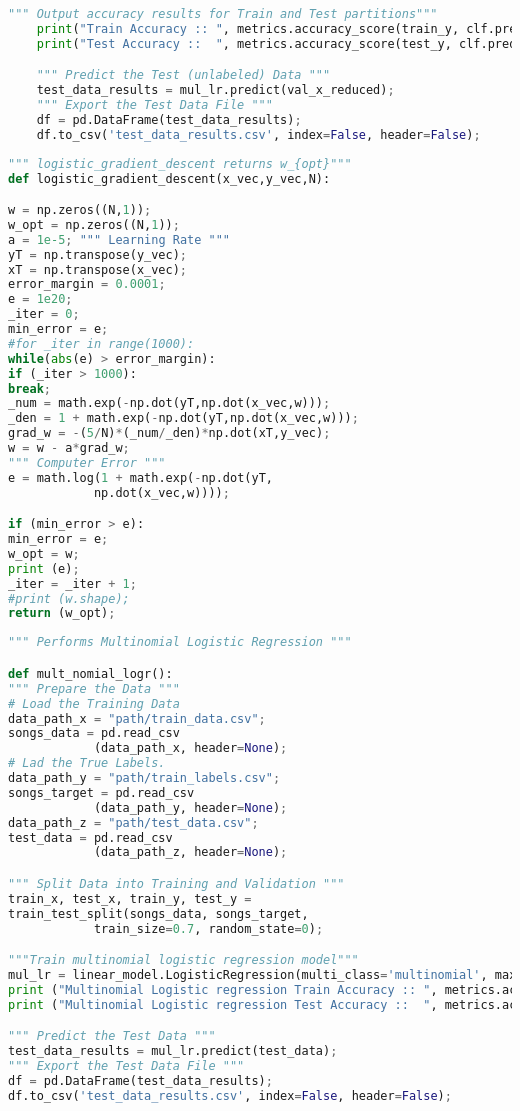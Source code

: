 \documentclass[journal]{IEEEtran}
\begin{document}
\begin{lstlisting}[language=Python, caption= KNN Clustering with Low Dimensional Embedding]
    """ Output accuracy results for Train and Test partitions"""
    print("Train Accuracy :: ", metrics.accuracy_score(train_y, clf.predict(train_x_reduced)));
    print("Test Accuracy ::  ", metrics.accuracy_score(test_y, clf.predict(test_x_reduced)));

	""" Predict the Test (unlabeled) Data """
	test_data_results = mul_lr.predict(val_x_reduced);
	""" Export the Test Data File """
	df = pd.DataFrame(test_data_results);
	df.to_csv('test_data_results.csv', index=False, header=False);
\end{lstlisting}

\begin{lstlisting}[language=Python, caption= Logistic Gradient Descent]
""" logistic_gradient_descent returns w_{opt}"""
def logistic_gradient_descent(x_vec,y_vec,N):

w = np.zeros((N,1));
w_opt = np.zeros((N,1));
a = 1e-5; """ Learning Rate """
yT = np.transpose(y_vec);
xT = np.transpose(x_vec);
error_margin = 0.0001;
e = 1e20;
_iter = 0;
min_error = e;
#for _iter in range(1000):
while(abs(e) > error_margin):
if (_iter > 1000):
break;
_num = math.exp(-np.dot(yT,np.dot(x_vec,w)));
_den = 1 + math.exp(-np.dot(yT,np.dot(x_vec,w)));
grad_w = -(5/N)*(_num/_den)*np.dot(xT,y_vec);
w = w - a*grad_w;
""" Computer Error """
e = math.log(1 + math.exp(-np.dot(yT,
			np.dot(x_vec,w))));

if (min_error > e):
min_error = e;
w_opt = w;
print (e);
_iter = _iter + 1;
#print (w.shape);
return (w_opt);
\end{lstlisting}

\begin{lstlisting}[language=Python, caption = Multinomial LogisticRegression]
""" Performs Multinomial Logistic Regression """

def mult_nomial_logr():
""" Prepare the Data """
# Load the Training Data
data_path_x = "path/train_data.csv";
songs_data = pd.read_csv
			(data_path_x, header=None);
# Lad the True Labels.
data_path_y = "path/train_labels.csv";
songs_target = pd.read_csv
			(data_path_y, header=None);
data_path_z = "path/test_data.csv";
test_data = pd.read_csv
			(data_path_z, header=None);

""" Split Data into Training and Validation """
train_x, test_x, train_y, test_y = 
train_test_split(songs_data, songs_target, 
			train_size=0.7, random_state=0);

"""Train multinomial logistic regression model"""
mul_lr = linear_model.LogisticRegression(multi_class='multinomial', max_iter=500, solver='netwon-cg').fit(train_x, train_y);
print ("Multinomial Logistic regression Train Accuracy :: ", metrics.accuracy_score(train_y, mul_lr.predict(train_x)));
print ("Multinomial Logistic regression Test Accuracy ::  ", metrics.accuracy_score(test_y, mul_lr.predict(test_x)));

""" Predict the Test Data """
test_data_results = mul_lr.predict(test_data);
""" Export the Test Data File """
df = pd.DataFrame(test_data_results);
df.to_csv('test_data_results.csv', index=False, header=False);
\end{lstlisting}
\end{document}

